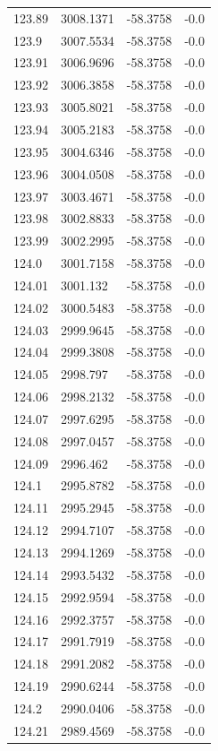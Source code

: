 \begin{table}[H]
\begin{tabular}{llll}
123.89 & 3008.1371 & -58.3758 & -0.0 \\
123.9 & 3007.5534 & -58.3758 & -0.0 \\
123.91 & 3006.9696 & -58.3758 & -0.0 \\
123.92 & 3006.3858 & -58.3758 & -0.0 \\
123.93 & 3005.8021 & -58.3758 & -0.0 \\
123.94 & 3005.2183 & -58.3758 & -0.0 \\
123.95 & 3004.6346 & -58.3758 & -0.0 \\
123.96 & 3004.0508 & -58.3758 & -0.0 \\
123.97 & 3003.4671 & -58.3758 & -0.0 \\
123.98 & 3002.8833 & -58.3758 & -0.0 \\
123.99 & 3002.2995 & -58.3758 & -0.0 \\
124.0 & 3001.7158 & -58.3758 & -0.0 \\
124.01 & 3001.132 & -58.3758 & -0.0 \\
124.02 & 3000.5483 & -58.3758 & -0.0 \\
124.03 & 2999.9645 & -58.3758 & -0.0 \\
124.04 & 2999.3808 & -58.3758 & -0.0 \\
124.05 & 2998.797 & -58.3758 & -0.0 \\
124.06 & 2998.2132 & -58.3758 & -0.0 \\
124.07 & 2997.6295 & -58.3758 & -0.0 \\
124.08 & 2997.0457 & -58.3758 & -0.0 \\
124.09 & 2996.462 & -58.3758 & -0.0 \\
124.1 & 2995.8782 & -58.3758 & -0.0 \\
124.11 & 2995.2945 & -58.3758 & -0.0 \\
124.12 & 2994.7107 & -58.3758 & -0.0 \\
124.13 & 2994.1269 & -58.3758 & -0.0 \\
124.14 & 2993.5432 & -58.3758 & -0.0 \\
124.15 & 2992.9594 & -58.3758 & -0.0 \\
124.16 & 2992.3757 & -58.3758 & -0.0 \\
124.17 & 2991.7919 & -58.3758 & -0.0 \\
124.18 & 2991.2082 & -58.3758 & -0.0 \\
124.19 & 2990.6244 & -58.3758 & -0.0 \\
124.2 & 2990.0406 & -58.3758 & -0.0 \\
124.21 & 2989.4569 & -58.3758 & -0.0 \\

\end{tabular}
\end{table}
